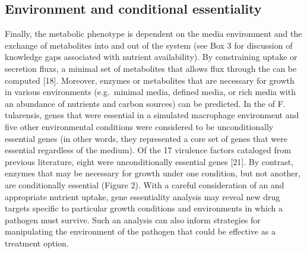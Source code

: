 \subsection{Environment and conditional essentiality}
Finally, the metabolic phenotype is dependent on the media 
environment and the exchange of metabolites into and out of 
the system (see Box 3 for discussion of knowledge gaps 
associated with nutrient availability). By constraining uptake 
or secretion \glspl{flux}, a minimal set of metabolites that allows 
\gls{flux} through the  can be computed [18]. Moreover, 
enzymes or metabolites that are necessary for growth in 
various environments (e.g.\ minimal media, defined media, 
or rich media with an abundance of nutrients and carbon sources) 
can be predicted. In the  of F. tularensis, 
genes that were essential in a simulated macrophage environment 
and five other environmental conditions were considered to be 
unconditionally essential genes (in other words, they 
represented a core set of genes that were essential regardless 
of the medium). Of the 17 virulence factors cataloged from 
previous literature, eight were unconditionally essential 
genes [21]. By contrast, enzymes that may be necessary for 
growth under one condition, but not another, are conditionally 
essential (Figure 2). With a careful consideration of an 
and appropriate nutrient uptake, gene essentiality analysis may 
reveal new drug targets specific to particular growth conditions 
and environments in which a pathogen must survive. Such an 
analysis can also inform strategies for manipulating the 
environment of the pathogen that could be effective as a 
treatment option.

